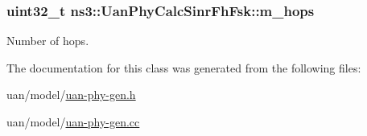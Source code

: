 \subsubsection[{\texorpdfstring{m\+\_\+hops}{m_hops}}]{\setlength{\rightskip}{0pt plus 5cm}uint32\+\_\+t ns3\+::\+Uan\+Phy\+Calc\+Sinr\+Fh\+Fsk\+::m\+\_\+hops\hspace{0.3cm}{\ttfamily [private]}}\hypertarget{classns3_1_1UanPhyCalcSinrFhFsk_ad3f404c81ac8fcc8987c991b51ecb717}{}\label{classns3_1_1UanPhyCalcSinrFhFsk_ad3f404c81ac8fcc8987c991b51ecb717}


Number of hops. 



The documentation for this class was generated from the following files\+:\begin{DoxyCompactItemize}
\item 
uan/model/\hyperlink{uan-phy-gen_8h}{uan-\/phy-\/gen.\+h}\item 
uan/model/\hyperlink{uan-phy-gen_8cc}{uan-\/phy-\/gen.\+cc}\end{DoxyCompactItemize}
